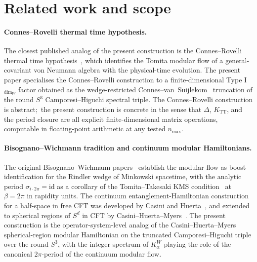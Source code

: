 \documentclass[11pt,a4paper]{article}
\theoremstyle{plain}
\theoremstyle{definition}
\newcommand{\nmax}{n_{\max}}
\newcommand{\sthree}{S^{3}}
\newcommand{\TT}{\mathrm{TT}}
\begin{document}
\section{Related work and scope}\label{sec:related_work}

\paragraph{Connes--Rovelli thermal time hypothesis.}
The closest published analog of the present construction is the
Connes--Rovelli thermal time hypothesis~\cite{connes_rovelli1994},
which identifies the Tomita modular flow of a general-covariant von
Neumann algebra with the physical-time evolution. The present paper
specialises the Connes--Rovelli construction to a finite-dimensional
Type I$_{\dim_W}$ factor obtained as the wedge-restricted
Connes--van~Suijlekom~\cite{connes_vs2021} truncation of the round
$\sthree$ Camporesi--Higuchi spectral triple. The Connes--Rovelli
construction is abstract;\ the present construction is concrete in
the sense that $\Delta$, $K_{\TT}$, and the period closure are all
explicit finite-dimensional matrix operations, computable in
floating-point arithmetic at any tested $\nmax$.

\paragraph{Bisognano--Wichmann tradition and continuum modular
Hamiltonians.}
The original Bisognano--Wichmann
papers~\cite{bisognano_wichmann1975, bisognano_wichmann1976} establish
the modular-flow-as-boost identification for the Rindler wedge of
Minkowski spacetime, with the analytic period $\sigma_{i \cdot 2\pi} =
\mathrm{id}$ as a corollary of the Tomita--Takesaki KMS
condition~\cite{takesaki1970, tomita1967} at $\beta = 2\pi$ in
rapidity units. The continuum entanglement-Hamiltonian construction
for a half-space in free CFT was developed by Casini and
Huerta~\cite{casini_huerta2009}, and extended to spherical regions of
$S^d$ in CFT by Casini--Huerta--Myers~\cite{casini_huerta_myers2011}.
The present construction is the operator-system-level analog of the
Casini--Huerta--Myers spherical-region modular Hamiltonian on the
truncated Camporesi--Higuchi triple over the round $\sthree$, with
the integer spectrum of $K_\alpha^W$ playing the role of the
canonical $2\pi$-period of the continuum modular flow.
\end{document}
